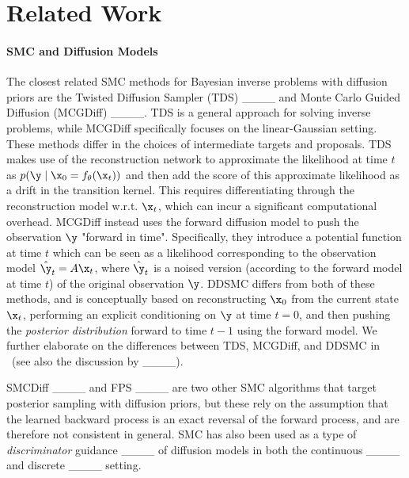 \section{Related Work}
\label{sec:related_work}
\paragraph{SMC and Diffusion Models} 
The closest related SMC methods for Bayesian inverse problems with diffusion priors are the Twisted Diffusion Sampler (TDS) ____ and Monte Carlo Guided Diffusion (MCGDiff) ____. TDS is a general approach for solving inverse problems, while MCGDiff specifically focuses on the linear-Gaussian setting. These methods differ in the choices of intermediate targets and proposals.
TDS makes use of the reconstruction network to approximate the likelihood at time $t$ as $p(\y \mid \x_0 = f_\theta(\x_{t}))$ and then add the score of this approximate likelihood as a drift in the transition kernel. This requires differentiating through the reconstruction model w.r.t. $\x_{t}$, which can incur a significant computational overhead. MCGDiff instead uses the forward diffusion model to push the observation $\y$ "forward in time". Specifically, they introduce a potential function at time $t$ which can be seen as a likelihood corresponding to the observation model $\hat \y_t = A\x_t$, where $\hat \y_t$ is a noised version (according to the forward model at time $t$) of the original observation $\y$. 
DDSMC differs from both of these methods, and is conceptually based on reconstructing $\x_0$ from the current state $\x_t$, performing an explicit conditioning on $\y$ at time $t=0$, and then pushing the \emph{posterior distribution} forward to time $t-1$ using the forward model.
We further elaborate on the differences between TDS, MCGDiff, and DDSMC in ~(see also the discussion by ____). 

SMCDiff ____ and FPS ____ are two other SMC algorithms that target posterior sampling with diffusion priors, but these rely on the assumption that the learned backward process is an exact reversal of the forward process, and are therefore not consistent in general. SMC has also been used as a type of \emph{discriminator} guidance ____ of diffusion models in both the continuous ____ and discrete ____ setting.

